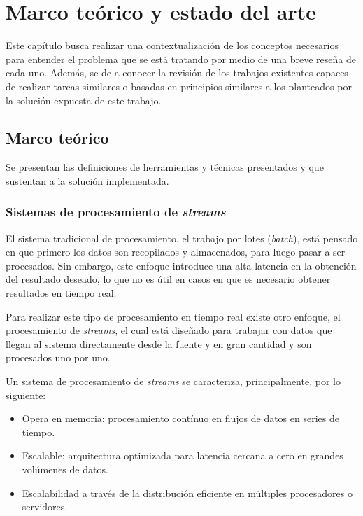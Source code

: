 \chapter{Marco teórico y estado del arte}
\label{cap:MarcTeorico}

Este capítulo busca realizar una contextualización de los conceptos necesarios para entender el problema que se está tratando por medio de una breve reseña de cada uno. Además, se de a conocer la revisión de los trabajos existentes capaces de realizar tareas similares o basadas en principios similares a los planteados por la solución expuesta de este trabajo.

\section{Marco teórico}
\label{intro:motivacion:marco}

Se presentan las definiciones de herramientas y técnicas presentados y que sustentan a la solución implementada.

\subsection{Sistemas de procesamiento de \textit{streams}}
\label{subsec:SPS}

El sistema tradicional de procesamiento, el trabajo por lotes (\textit{batch}), está pensado en que primero los datos son recopilados y almacenados, para luego pasar a ser procesados. Sin embargo, este enfoque introduce una alta latencia en la obtención del resultado deseado, lo que no es útil en casos en que es necesario obtener resultados en tiempo real.

Para realizar este tipo de procesamiento en tiempo real existe otro enfoque, el procesamiento de \textit{streams}, el cual está diseñado para trabajar con datos que llegan al sistema directamente desde la fuente y en gran cantidad y son procesados uno por uno.

Un sistema de procesamiento de \textit{streams} se caracteriza, principalmente, por lo siguiente:

\begin{itemize}
\item Opera en memoria: procesamiento contínuo en flujos de datos en series de tiempo.
\item Escalable: arquitectura optimizada para latencia cercana a cero en grandes volúmenes de datos.
\item Escalabilidad a través de la distribución eficiente en múltiples procesadores o servidores.
\end{itemize}


